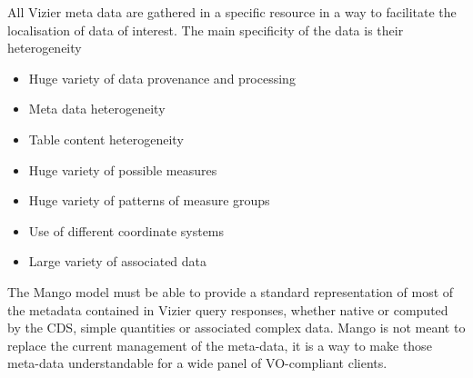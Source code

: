 \documentclass[11pt,a4paper]{ivoa}
\begin{document}
All Vizier meta data are gathered in a specific resource in a way to facilitate the localisation of data of interest.
The main specificity of the data is their heterogeneity
\begin{itemize}
\item Huge variety of data provenance and processing
\item Meta data heterogeneity
\item Table content heterogeneity
\item Huge variety of possible measures
\item Huge variety of patterns of measure groups
\item Use of different coordinate systems
\item Large variety of associated data
\end{itemize}

The Mango model must be able to provide a standard representation of most of the metadata contained in Vizier query responses, whether native or computed  by the CDS, simple quantities or associated complex data.
Mango is not meant to replace the current management of the meta-data, it is a way to make those meta-data understandable for a wide panel of VO-compliant clients.

%
%
%
%
\end{document}
